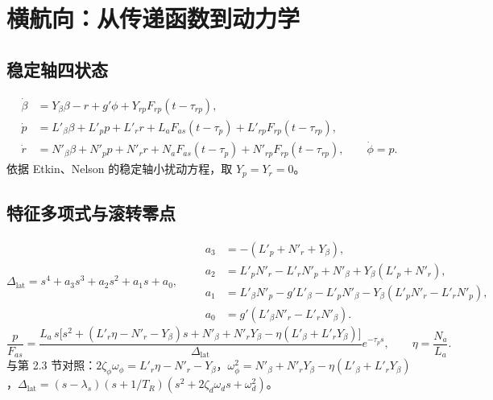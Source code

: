 \documentclass[UTF8,a4paper,11pt,fontset=fandol,scheme=plain]{ctexart}
\begin{document}
\section{横航向：从传递函数到动力学}
\label{sec:lat}
\subsection{稳定轴四状态}
\begin{equation}
\begin{aligned}
\dot\beta&=Y_\beta\beta-r+g'\phi+Y_{rp}F_{rp}(t-\tau_{rp}),\\
\dot p&=L'_\beta\beta+L'_pp+L'_rr+L_aF_{as}(t-\tau_p)+L'_{rp}F_{rp}(t-\tau_{rp}),\\
\dot r&=N'_\beta\beta+N'_pp+N'_rr+N_aF_{as}(t-\tau_p)+N'_{rp}F_{rp}(t-\tau_{rp}),\qquad \dot\phi=p .
\end{aligned}
\label{eq:lat}
\end{equation}
依据 Etkin、Nelson 的稳定轴小扰动方程，取 \(Y_p=Y_r=0\)。

\subsection{特征多项式与滚转零点}
\begin{equation}
\Delta_{\mathrm{lat}}=s^4+a_3s^3+a_2s^2+a_1s+a_0,\qquad
\begin{aligned}
a_3&=-(L'_p+N'_r+Y_\beta),\\
a_2&=L'_pN'_r-L'_rN'_p+N'_\beta+Y_\beta(L'_p+N'_r),\\
a_1&=L'_\beta N'_p-g'L'_\beta-L'_pN'_\beta-Y_\beta(L'_pN'_r-L'_rN'_p),\\
a_0&=g'(L'_\beta N'_r-L'_rN'_\beta).
\end{aligned}
\end{equation}
\begin{equation}
\frac{p}{F_{as}}=\frac{L_a\,s\bigl[s^2+(L'_r\eta-N'_r-Y_\beta)s+N'_\beta+N'_rY_\beta-\eta(L'_\beta+L'_rY_\beta)\bigr]}{\Delta_{\mathrm{lat}}}e^{-\tau_ps},\qquad \eta=\frac{N_a}{L_a}.
\end{equation}
与第 2.3 节对照：\(2\zeta_\phi\omega_\phi=L'_r\eta-N'_r-Y_\beta\)，\(\omega_\phi^2=N'_\beta+N'_rY_\beta-\eta(L'_\beta+L'_rY_\beta)\)，\(\Delta_{\mathrm{lat}}=(s-\lambda_s)(s+1/T_R)(s^2+2\zeta_d\omega_d s+\omega_d^2)\)。
\end{document}
